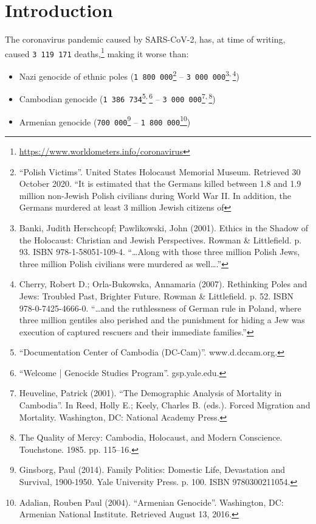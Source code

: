 \documentclass[11pt]{article}
\begin{document}
\section{Introduction}
\label{sec:org90889d9}
The coronavirus pandemic caused by SARS-CoV-2, has, at time of writing, caused \texttt{3 119 171} deaths,\footnote{\url{https://www.worldometers.info/coronavirus}} making it worse than:
\begin{itemize}
\item Nazi genocide of ethnic poles (\texttt{1 800 000}\footnote{``Polish Victims''. United States Holocaust Memorial Museum. Retrieved 30 October 2020. ``It is estimated that the Germans killed between 1.8 and 1.9 million non-Jewish Polish civilians during World War II. In addition, the Germans murdered at least 3 million Jewish citizens of} -- \texttt{3 000 000}\footnote{Banki, Judith Herschcopf; Pawlikowski, John (2001). Ethics in the Shadow of the Holocaust: Christian and Jewish Perspectives. Rowman \& Littlefield. p. 93. ISBN 978-1-58051-109-4. ``\ldots{}Along with those three million Polish Jews, three million Polish civilians were murdered as well\ldots{}.''}\textsuperscript{,}\,\footnote{Cherry, Robert D.; Orla-Bukowska, Annamaria (2007). Rethinking Poles and Jews: Troubled Past, Brighter Future. Rowman \& Littlefield. p. 52. ISBN 978-0-7425-4666-0. ``\ldots{}and the ruthlessness of German rule in Poland, where three million gentiles also perished and the punishment for hiding a Jew was execution of captured rescuers and their immediate families.''})
\item Cambodian genocide (\texttt{1 386 734}\footnote{``Documentation Center of Cambodia (DC-Cam)''. www.d.dccam.org.}\textsuperscript{,}\,\footnote{``Welcome | Genocide Studies Program''. gsp.yale.edu.} -- \texttt{3 000 000}\footnote{Heuveline, Patrick (2001). ``The Demographic Analysis of Mortality in Cambodia''. In Reed, Holly E.; Keely, Charles B. (eds.). Forced Migration and Mortality. Washington, DC: National Academy Press.}\textsuperscript{,}\,\footnote{The Quality of Mercy: Cambodia, Holocaust, and Modern Conscience. Touchstone. 1985. pp. 115–16.})
\item Armenian genocide (\texttt{700 000}\footnote{Ginsborg, Paul (2014). Family Politics: Domestic Life, Devastation and Survival, 1900-1950. Yale University Press. p. 100. ISBN 9780300211054.} -- \texttt{1 800 000}\footnote{Adalian, Rouben Paul (2004). ``Armenian Genocide''. Washington, DC: Armenian National Institute. Retrieved August 13, 2016.})

\end{itemize}
\end{document}

